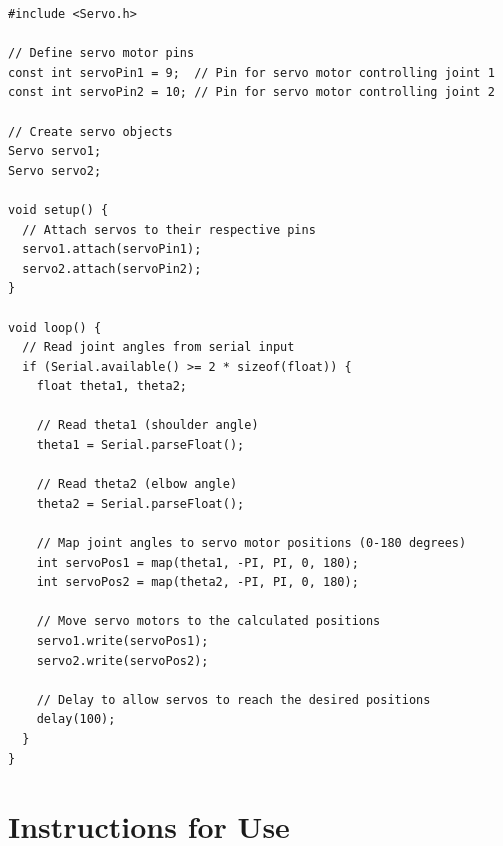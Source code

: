 \documentclass{article}
\begin{document}
\begin{lstlisting}[style=ArduinoStyle, caption={Arduino Program for Robotic Arm Control}, label=arduino]
#include <Servo.h>

// Define servo motor pins
const int servoPin1 = 9;  // Pin for servo motor controlling joint 1
const int servoPin2 = 10; // Pin for servo motor controlling joint 2

// Create servo objects
Servo servo1;
Servo servo2;

void setup() {
  // Attach servos to their respective pins
  servo1.attach(servoPin1);
  servo2.attach(servoPin2);
}

void loop() {
  // Read joint angles from serial input
  if (Serial.available() >= 2 * sizeof(float)) {
    float theta1, theta2;
    
    // Read theta1 (shoulder angle)
    theta1 = Serial.parseFloat();
    
    // Read theta2 (elbow angle)
    theta2 = Serial.parseFloat();

    // Map joint angles to servo motor positions (0-180 degrees)
    int servoPos1 = map(theta1, -PI, PI, 0, 180);
    int servoPos2 = map(theta2, -PI, PI, 0, 180);

    // Move servo motors to the calculated positions
    servo1.write(servoPos1);
    servo2.write(servoPos2);

    // Delay to allow servos to reach the desired positions
    delay(100);
  }
}
\end{lstlisting}

\section{Instructions for Use}
\end{document}
